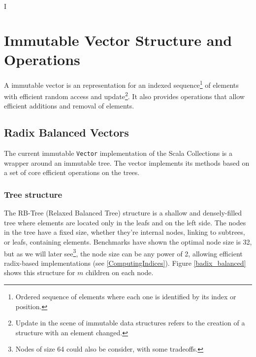 I%

\chapter{Immutable Vector Structure and Operations} %

\label{VectorStructure} %



 A immutable vector is an representation for an indexed sequence\footnote{Ordered sequence of elements where each one is identified by its index or position.} of elements with efficient random access and update\footnote{Update in the scene of immutable data structures refers to the creation of a structure with an element changed.}. It also provides operations that allow efficient additions and removal of elements.
 
\section{Radix Balanced Vectors}
\label{RadixBalancedVectors}
The current immutable \texttt{Vector} implementation\cite{scalaVector211} of the Scala Collections is a wrapper around an immutable tree. The vector implements its methods based on a set of core efficient operations on the trees.


\subsection{Tree structure}
\label{RRBTreeStructure}
The RB-Tree (Relaxed Balanced Tree)  structure is a shallow and densely-filled tree where elements are located only in the leafs and on the left side. The nodes in the tree have a fixed size, whether they're internal nodes, linking to subtrees, or leafs, containing elements. Benchmarks have shown the optimal node size is 32, but as we will later see\footnote{Nodes of size 64 could also be consider, with some tradeoffs.}, the node size can be any power of 2, allowing efficient radix-based implementations (see \ref{ComputingIndices}). Figure \ref{badix_balanced} shows this structure for $m$ children on each node. 

